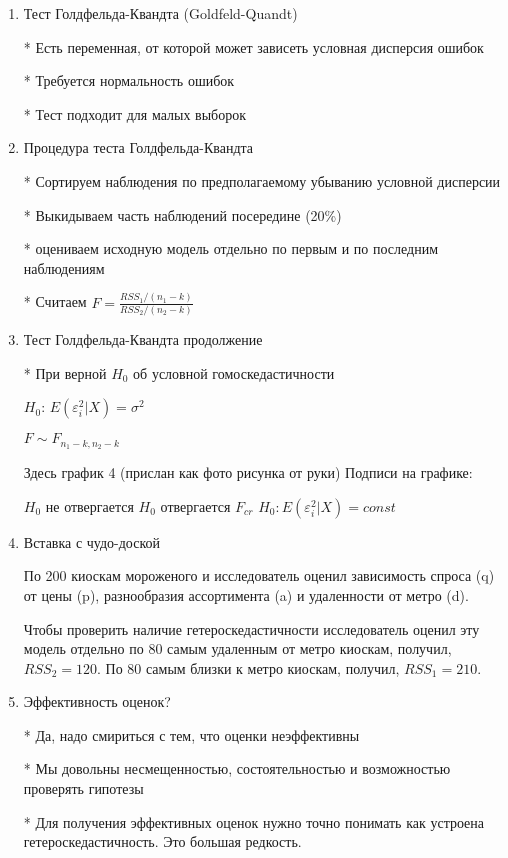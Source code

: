 \documentclass[12pt,a4paper]{article}
\begin{document}
{\begin{enumerate}
Как выглядит вспомогательная регрессия?

Имеет ли место условная гетероскедастичность?

\newpage
\item Тест Голдфельда-Квандта (Goldfeld-Quandt)

* Есть переменная, от которой может зависеть условная дисперсия ошибок

* Требуется нормальность ошибок

* Тест подходит для малых выборок

\item Процедура теста Голдфельда-Квандта

* Сортируем наблюдения по предполагаемому убыванию условной дисперсии

* Выкидываем часть наблюдений посередине (20\%)

* оцениваем исходную модель отдельно по первым и по последним наблюдениям

* Считаем $F=\frac{RSS_1/(n_1-k)}{RSS_2/(n_2-k)}$

\newpage
\item Тест Голдфельда-Квандта продолжение

* При верной $H_0$ об условной гомоскедастичности

$H_0$: $E(\varepsilon^2_i|X)=\sigma^2$

$F\sim F_{n_1-k,n_2-k}$

Здесь график 4 (прислан как фото рисунка от руки)
Подписи на графике:

$H_0$ не отвергается
$H_0$ отвергается
$F_{cr}$
$H_0: E(\varepsilon_i^2 | X)=const$

\item Вставка с чудо-доской

По 200 киоскам мороженого и  исследователь оценил зависимость спроса (q) от цены (p), разнообразия ассортимента (a) и удаленности от метро (d).

Чтобы проверить наличие гетероскедастичности исследователь оценил эту модель отдельно по 80 самым удаленным от метро киоскам, получил, $RSS_2=120$. По 80 самым близки к метро киоскам, получил, $RSS_1=210$. 

\newpage
\item Эффективность оценок?

* Да, надо смириться с тем, что оценки неэффективны

* Мы довольны несмещенностью, состоятельностью и возможностью проверять гипотезы

* Для получения эффективных оценок нужно точно понимать как устроена гетероскедастичность. Это большая редкость.



\end{enumerate}}
\end{document}
